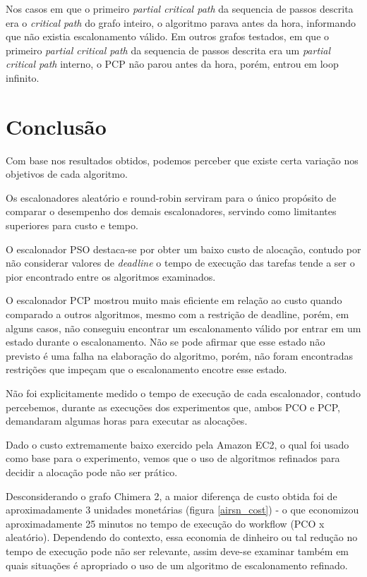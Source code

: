 \documentclass[a4paper,10pt]{article}
\begin{document}
Nos casos em que o primeiro \emph{partial critical path} da sequencia de passos descrita era o \emph{critical path} do grafo inteiro, o algoritmo parava antes da hora, informando que não existia escalonamento válido.  Em outros grafos testados, em que o primeiro \emph{partial critical path} da sequencia de passos descrita era um \emph{partial critical path} interno, o PCP não parou antes da hora, porém, entrou em loop infinito.

\section{Conclusão}

Com base nos resultados obtidos, podemos perceber que existe certa variação nos
objetivos de cada algoritmo.

Os escalonadores aleatório e round-robin serviram para o único propósito de comparar
o desempenho dos demais escalonadores, servindo como limitantes superiores para custo
e tempo.

O escalonador PSO destaca-se por obter um baixo custo de alocação, contudo por não considerar
valores de \emph{deadline} o tempo de execução das tarefas tende a ser o pior encontrado
entre os algoritmos examinados.

O escalonador PCP mostrou muito mais eficiente em relação ao custo quando comparado a outros algoritmos, mesmo com a restrição de deadline, porém, em alguns casos, não conseguiu encontrar um escalonamento válido por entrar em um estado durante o escalonamento. Não se pode afirmar que esse estado não previsto é uma falha na elaboração do algoritmo, porém, não foram encontradas restrições que impeçam que o escalonamento encotre esse estado.

Não foi explicitamente medido o tempo de execução de cada escalonador, contudo percebemos,
durante as execuções dos experimentos que, ambos PCO e PCP, demandaram algumas horas para
executar as alocações.

Dado o custo extremamente baixo exercido pela Amazon EC2, o qual foi usado como base para
o experimento, vemos que o uso de algoritmos refinados para decidir a alocação pode não ser
prático.

Desconsiderando o grafo Chimera 2, a maior diferença de custo obtida foi de aproximadamente
3 unidades monetárias (figura \ref{airsn_cost}) - o que economizou aproximadamente
25 minutos no tempo de execução do workflow (PCO x aleatório).
Dependendo do contexto, essa economia de dinheiro ou tal redução no tempo de execução pode não
ser relevante, assim deve-se examinar também em quais situações é apropriado o uso de um algoritmo
de escalonamento refinado.
\end{document}
